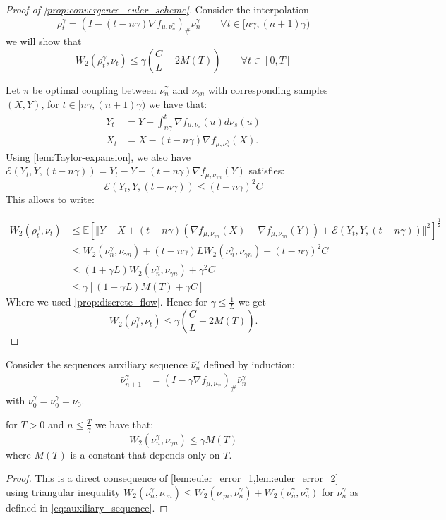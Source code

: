 \begin{proof}[Proof of \cref{prop:convergence_euler_scheme}]\label{proof:prop:convergence_euler_scheme}
Consider the interpolation 
\[
\rho_{t}^{\gamma}=(I-(t-n\gamma)\nabla f_{\mu,\nu_{n}^{\gamma}})_{\#}\nu_{n}^{\gamma}\qquad\forall t\in[n\gamma,(n+1)\gamma)
\]
we will show that 
\[
W_{2}(\rho_{t}^{\gamma},\nu_{t})\leq\gamma(\frac{C}{L}+2M(T))\qquad\forall t\in[0,T]
\]

Let $\pi$ be optimal coupling between $\nu_{n}^{\gamma}$ and $\nu_{\gamma n}$
with corresponding samples $(X,Y)$, for $t\in[n\gamma,(n+1)\gamma)$
we have that:
\begin{align*}
Y_{t} & =Y-\int_{n\gamma}^{t}\nabla f_{\mu,\nu_{s}}(u)d\nu_{s}(u)\\
X_{t} & =X-(t-n\gamma)\nabla f_{\mu,\nu_{n}^{\gamma}}(X).
\end{align*}
Using \ref{lem:Taylor-expansion}, we also have $\mathcal{E}(Y_{t},Y,(t-n\gamma))=Y_{t}-Y-(t-n\gamma)\nabla f_{\mu,\nu_{\gamma n}}(Y)$
satisfies:
\[
\mathcal{E}(Y_{t},Y,(t-n\gamma))\leq(t-n\gamma)^{2}C
\]
This allows to write:

\begin{align*}
W_{2}(\rho_{t}^{\gamma},\nu_{t}) & \leq\mathbb{E}\left[\Vert Y-X+(t-n\gamma)(\nabla f_{\mu,\nu_{\gamma n}}(X)-\nabla f_{\mu,\nu_{\gamma n}}(Y))+\mathcal{E}(Y_{t},Y,(t-n\gamma))\Vert^{2}\right]^{\frac{1}{2}}\\
 & \leq W_{2}(\nu_{n}^{\gamma},\nu_{\gamma n})+(t-n\gamma)LW_{2}(\nu_{n}^{\gamma},\nu_{\gamma n})+(t-n\gamma)^{2}C\\
 & \leq(1+\gamma L)W_{2}(\nu_{n}^{\gamma},\nu_{\gamma n})+\gamma^{2}C\\
 & \leq\gamma\left[(1+\gamma L)M(T)+\gamma C\right]
\end{align*}
Where we used \cref{prop:discrete_flow}. Hence for $\gamma\leq\frac{1}{L}$ we get 
\[
W_{2}(\rho_{t}^{\gamma},\nu_{t})\leq\gamma(\frac{C}{L}+2M(T)).
\]
\end{proof}


Consider the sequences auxiliary sequence $\bar{\nu}_{n}^{\gamma}$
defined by induction: 
\begin{align}\label{eq:auxiliary_sequence}
\bar{\nu}_{n+1}^{\gamma} & =(I-\gamma\nabla f_{\mu,\nu_{^{\gamma n}}})_{\#}\bar{\nu}_{n}^{\gamma}
\end{align}
 with $\bar{\nu}_{0}^{\gamma}=\nu_{0}^{\gamma}=\nu_{0}$.

\begin{proposition}\label{prop:discrete_flow}
for $T>0$ and $n\leq\frac{T}{\gamma}$ we have that:
\[
W_{2}(\nu_{n}^{\gamma},\nu_{\gamma n})\leq\gamma M(T)
\]
where $M(T)$ is a constant that depends only on $T$.
\end{proposition}
\begin{proof}
	This is a direct consequence of \cref{lem:euler_error_1,lem:euler_error_2} using triangular inequality $W_{2}(\nu_{n}^{\gamma},\nu_{\gamma n}) \leq W_{2}(\nu_{\gamma n},\bar{\nu}_{n}^{\gamma}) + W_{2}(\nu_{n}^{\gamma},\bar{\nu}_{n}^{\gamma})  $ for $\bar{\nu}_n^{\gamma}$ as defined in \cref{eq:auxiliary_sequence}.
\end{proof}

